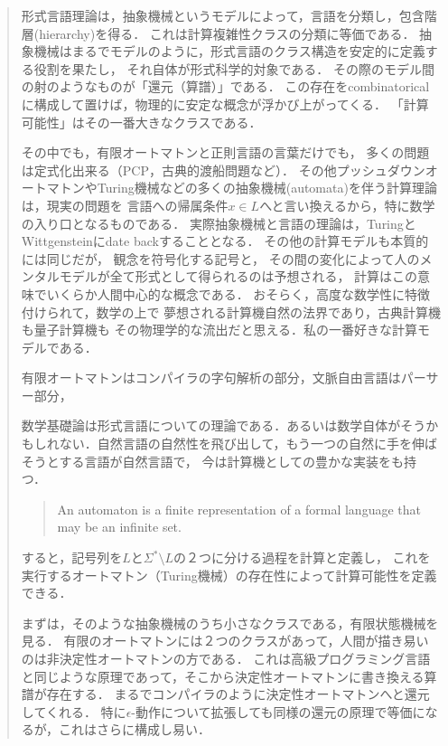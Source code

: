 \begin{quotation}
    形式言語理論は，抽象機械というモデルによって，言語を分類し，包含階層(hierarchy)を得る．
    これは計算複雑性クラスの分類に等価である．
    抽象機械はまるでモデルのように，形式言語のクラス構造を安定的に定義する役割を果たし，
    それ自体が形式科学的対象である．
    その際のモデル間の射のようなものが「還元（算譜）」である．
    この存在をcombinatoricalに構成して置けば，物理的に安定な概念が浮かび上がってくる．
    「計算可能性」はその一番大きなクラスである．

    その中でも，有限オートマトンと正則言語の言葉だけでも，
    多くの問題は定式化出来る（PCP，古典的渡船問題など）．
    その他プッシュダウンオートマトンやTuring機械などの多くの抽象機械(automata)を伴う計算理論は，現実の問題を
    言語への帰属条件$x\in L$へと言い換えるから，特に数学の入り口となるものである．
    実際抽象機械と言語の理論は，TuringとWittgensteinにdate backすることとなる．
    その他の計算モデルも本質的には同じだが，
    観念を符号化する記号と，
    その間の変化によって人のメンタルモデルが全て形式として得られるのは予想される，
    計算はこの意味でいくらか人間中心的な概念である．
    おそらく，高度な数学性に特徴付けられて，数学の上で
    夢想される計算機自然の法界であり，古典計算機も量子計算機も
    その物理学的な流出だと思える．私の一番好きな計算モデルである．

    有限オートマトンはコンパイラの字句解析の部分，文脈自由言語はパーサー部分，

    数学基礎論は形式言語についての理論である．あるいは数学自体がそうかもしれない．自然言語の自然性を飛び出して，もう一つの自然に手を伸ばそうとする言語が自然言語で，
    今は計算機としての豊かな実装をも持つ．
    \begin{quote}
    An automaton is a finite representation of a formal language that may be an infinite set.
    \end{quote}

    すると，記号列を$L$と$\Sigma^*\setminus L$の２つに分ける過程を計算と定義し，
    これを実行するオートマトン（Turing機械）の存在性によって計算可能性を定義できる．

    まずは，そのような抽象機械のうち小さなクラスである，有限状態機械を見る．
    有限のオートマトンには２つのクラスがあって，人間が描き易いのは非決定性オートマトンの方である．
    これは高級プログラミング言語と同じような原理であって，そこから決定性オートマトンに書き換える算譜が存在する．
    まるでコンパイラのように決定性オートマトンへと還元してくれる．
    特に$\epsilon$-動作について拡張しても同様の還元の原理で等価になるが，これはさらに構成し易い．
\end{quotation}

